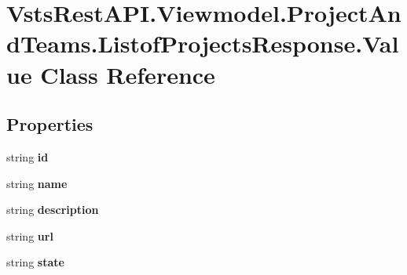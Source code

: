 \hypertarget{class_vsts_rest_a_p_i_1_1_viewmodel_1_1_project_and_teams_1_1_listof_projects_response_1_1_value}{}\section{Vsts\+Rest\+A\+P\+I.\+Viewmodel.\+Project\+And\+Teams.\+Listof\+Projects\+Response.\+Value Class Reference}
\label{class_vsts_rest_a_p_i_1_1_viewmodel_1_1_project_and_teams_1_1_listof_projects_response_1_1_value}
\subsection*{Properties}
\begin{DoxyCompactItemize}
\item 
\mbox{\label{class_vsts_rest_a_p_i_1_1_viewmodel_1_1_project_and_teams_1_1_listof_projects_response_1_1_value_a7db91f69af44f72f327ec2ae6c8529ba}} 
string {\bfseries id}
\item 
\mbox{\label{class_vsts_rest_a_p_i_1_1_viewmodel_1_1_project_and_teams_1_1_listof_projects_response_1_1_value_a183ad4f36e41446744538fbd52336c17}} 
string {\bfseries name}
\item 
\mbox{\label{class_vsts_rest_a_p_i_1_1_viewmodel_1_1_project_and_teams_1_1_listof_projects_response_1_1_value_a686d6fe50e5c5ac604eb47f55f120f4a}} 
string {\bfseries description}
\item 
\mbox{\label{class_vsts_rest_a_p_i_1_1_viewmodel_1_1_project_and_teams_1_1_listof_projects_response_1_1_value_aaa15b8fef7feb0ccae36ba5afb47b735}} 
string {\bfseries url}
\item 
\mbox{\label{class_vsts_rest_a_p_i_1_1_viewmodel_1_1_project_and_teams_1_1_listof_projects_response_1_1_value_ab209f4ddc0a1718c5901312fb5b1a8aa}} 
string {\bfseries state}
\end{DoxyCompactItemize}


